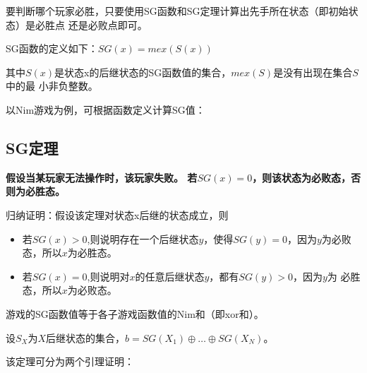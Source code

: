 要判断哪个玩家必胜，只要使用SG函数和SG定理计算出先手所在状态（即初始状态）是必胜点
还是必败点即可。

SG函数的定义如下：$SG(x)=mex(S(x))$

其中$S(x)$是状态x的后继状态的SG函数值的集合，$mex(S)$是没有出现在集合$S$中的最
小非负整数。

以Nim游戏为例，可根据函数定义计算SG值：



\subsection{SG定理}

\begin{Theorem}
	\bfseries 假设当某玩家无法操作时，该玩家失败。\mdseries
	若$SG(x)=0$，则该状态为必败态，否则为必胜态。
\end{Theorem}

归纳证明：假设该定理对状态x后继的状态成立，则

\begin{itemize}
	\item 若$SG(x)>0$,则说明存在一个后继状态$y$，使得$SG(y)=0$，因为$y$为必败
	      态，所以$x$为必胜态。
	\item 若$SG(x)=0$,则说明对$x$的任意后继状态$y$，都有$SG(y)>0$，因为$y$为
	      必胜态，所以$x$为必败态。
\end{itemize}

\begin{Theorem}\label{SGB}
	游戏的SG函数值等于各子游戏函数值的Nim和（即xor和）。
\end{Theorem}

设$S_X$为$X$后继状态的集合，$b=SG(X_1)\oplus \ldots \oplus SG(X_N)$。

该定理可分为两个引理证明：

